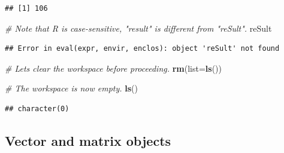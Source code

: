 \documentclass[
]{book}
\newenvironment{Shaded}{\begin{snugshade}}{\end{snugshade}}
\newcommand{\AttributeTok}[1]{\textcolor[rgb]{0.13,0.29,0.53}{#1}}
\newcommand{\CommentTok}[1]{\textcolor[rgb]{0.56,0.35,0.01}{\textit{#1}}}
\newcommand{\FunctionTok}[1]{\textcolor[rgb]{0.13,0.29,0.53}{\textbf{#1}}}
\newcommand{\NormalTok}[1]{#1}
\begin{document}
\begin{verbatim}
## [1] 106
\end{verbatim}

\begin{Shaded}
\begin{Highlighting}[]
\CommentTok{\# Note that R is case{-}sensitive, "result" is different from "reSult".}
\NormalTok{reSult}
\end{Highlighting}
\end{Shaded}

\begin{verbatim}
## Error in eval(expr, envir, enclos): object 'reSult' not found
\end{verbatim}

\begin{Shaded}
\begin{Highlighting}[]
\CommentTok{\# Let\textquotesingle{}s clear the workspace before proceeding.}
\FunctionTok{rm}\NormalTok{(}\AttributeTok{list=}\FunctionTok{ls}\NormalTok{())}

\CommentTok{\# The workspace is now empty.}
\FunctionTok{ls}\NormalTok{()}
\end{Highlighting}
\end{Shaded}

\begin{verbatim}
## character(0)
\end{verbatim}

\hypertarget{vector-and-matrix-objects}{%
\subsection{Vector and matrix objects}\label{vector-and-matrix-objects}}
\end{document}
